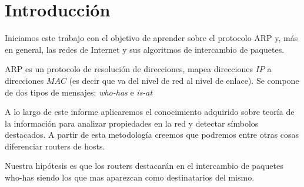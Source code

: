 \section{Introducción}

Iniciamos este trabajo con el objetivo de aprender sobre el protocolo ARP y, más en general, las redes de Internet y sus algoritmos de intercambio de paquetes. 

ARP es un protocolo de resolución de direcciones, mapea direcciones $IP$ a direcciones $MAC$ (es decir que va del nivel de red al nivel de enlace). Se compone de dos tipos de mensajes: \emph{who-has} e \emph{is-at}

A lo largo de este informe aplicaremos el conocimiento adquirido sobre teoría de la información para analizar propiedades en la red y detectar símbolos destacados. A partir de esta metodología creemos que podremos entre otras cosas diferenciar routers de hosts.

Nuestra hipótesis es que los routers destacarán en el intercambio de paquetes who-has siendo los que mas aparezcan como destinatarios del mismo.
